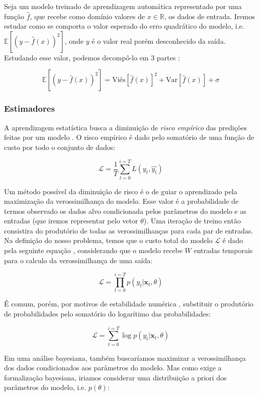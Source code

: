 Seja um modelo treinado de aprendizagem automática representado por uma função
$\hat{f}$, que recebe como domínio valores de $x \in \mathbb{R}$, os dados de
entrada. Iremos estudar como se comporta o valor esperado do erro quadrático do
modelo, i.e. $\mathbb{E}[(y - \hat{f}(x))^2]$, onde $y$ é o valor real porém
desconhecido da saída. Estudando esse valor, podemos decompô-lo em
3 partes \citep{mlprob}:

\[
  \mathbb{E}[(y - \hat{f}(x))^2] = \text{Viés}[\hat{f}(x)]^2 +
  \text{Var}[\hat{f}(x)] + \sigma 
\]



\subsubsection{Estimadores}
\label{sec:est}

A aprendizagem estatística busca a diminuição de \textit{risco empírico} das predições feitas por
um modelo \citep{mlprob}. O risco empírico é dado pelo somatório de uma função
de custo por todo o conjunto de dados:

\[
  \mathcal{L} = \frac{1}{T}\sum_{t=0}^{i=T}L(y_t,\hat{y_t}) 
\]

Um método possível da diminuição de risco é o de guiar o aprendizado pela
maximização da verossimilhança do modelo. Esse valor é a probabilidade de termos
observado os dados alvo condicionada pelos parâmetros do modelo e as entradas
(que iremos representar pelo vetor $\theta$). Uma iteração de
treino então consistira do produtório de todas as verossimilhanças para cada par
de entradas. Na definição do nosso problema, temos que o custo total do modelo
$\mathcal{L}$ é dado pela seguinte equação \citep{dlbook}, considerando que o
modelo recebe $W$ entradas temporais para o calculo da verossimilhança de uma saída:

\[
\mathcal{L} = \prod_{t=0}^{i=T} p(y_t | \textbf{x}_{t}, \theta) 
\]

É comum, porém, por motivos de estabilidade numérica \citep{dlbook}, substituir
o produtório de probabilidades pelo somatório do logarítimo das probabilidades: 

\[
  \mathcal{L} = \sum_{t=0}^{i=T} \log{p(y_t | \textbf{x}_{t},\theta)}
\]

Em uma análise bayesiana, também buscaríamos maximizar a verossimilhança dos
dados condicionados aos parâmetros do modelo. Mas como exige a formalização
bayesiana, iriamos considerar uma distribuição a priori dos parâmetros do
modelo, i.e. $p(\theta)$:


